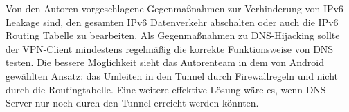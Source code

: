 Von den Autoren vorgeschlagene Gegenmaßnahmen zur Verhinderung von IPv6 Leakage sind,
 den gesamten IPv6 Datenverkehr abschalten oder auch die IPv6 Routing Tabelle zu bearbeiten. 
 Als Gegenmaßnahmen zu DNS-Hijacking sollte der VPN-Client mindestens regelmäßig die korrekte Funktionsweise von DNS testen. Die bessere Möglichkeit sieht das Autorenteam in dem von Android gewählten Ansatz: das Umleiten in den Tunnel durch Firewallregeln und nicht durch die Routingtabelle. Eine weitere effektive Lösung wäre es, wenn DNS-Server nur noch durch den Tunnel erreicht werden könnten. 
  


 






